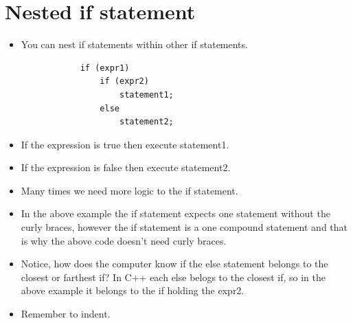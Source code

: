 \section{Nested if statement}
\begin{itemize}
    \item You can nest if statements within other if statements.
        \begin{verbatim}
            if (expr1) 
                if (expr2) 
                    statement1;
                else 
                    statement2;
        \end{verbatim}
    
    \item If the expression is true then execute statement1.
    \item If the expression is false then execute statement2.
    \item Many times we need more logic to the if statement.
    \item In the above example the if statement expects one statement without the curly braces, however the if statement is a one compound statement and that is why the above code doesn't need curly braces.
    \item Notice, how does the computer know if the else statement belongs to the closest or farthest if? In C++ each else belogs to the closest if, so in the above example it belongs to the if holding the expr2.
    \item Remember to indent.
\end{itemize}

